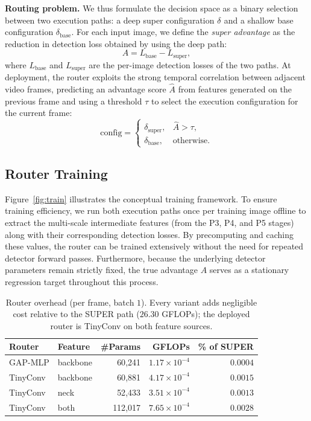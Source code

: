 \medskip
\noindent\textbf{Routing problem.}
We thus formulate the decision space as a binary selection between two execution paths: a deep super configuration $\delta_{\text{}}$ and a shallow base configuration $\delta_{\text{base}}$. 
For each input image, we define the \emph{super advantage} as the reduction in detection loss obtained by using the deep path:
\begin{equation}
A = L_{\text{base}} - L_{\text{super}},
\label{eq:advantage}
\end{equation}
where $L_{\text{base}}$ and $L_{\text{super}}$ are the per-image detection
losses of the two paths. 
At deployment, the router exploits the strong temporal correlation between adjacent video frames, predicting an advantage score $\hat{A}$ from features generated on the previous frame and using a threshold $\tau$ to select the execution configuration for the current frame:
\begin{equation}
\text{config} =
\begin{cases}
\delta_{\text{super}}, & \hat{A} > \tau,\\[2pt]
\delta_{\text{base}},  & \text{otherwise.}
\end{cases}
\label{eq:route}
\end{equation}


\subsection{Router Training}
\label{sec:method_training}
Figure~\ref{fig:train} illustrates the conceptual training framework.
To ensure training efficiency, we run both execution paths once per training image offline to extract the multi-scale intermediate features (from the P3, P4, and P5 stages) along with their corresponding detection losses.
By precomputing and caching these values, the router can be trained extensively without the need for repeated detector forward passes.
Furthermore, because the underlying detector parameters remain strictly fixed, the true advantage $A$ serves as a stationary regression target throughout this process.


\begin{table}[t]
\caption{Router overhead (per frame, batch $1$). Every variant adds negligible cost
relative to the SUPER path ($26.30$ GFLOPs); the deployed router is TinyConv on both feature sources.}
\label{tab:overhead}
\centering
\begin{tabular}{llrrr}
\toprule
Router & Feature & \#Params & GFLOPs & \% of SUPER\\
\midrule
GAP-MLP & backbone & 60{,}241 & $1.17\times10^{-4}$ & $0.0004$\\
TinyConv & backbone & 60{,}881 & $4.17\times10^{-4}$ & $0.0015$\\
TinyConv & neck & 52{,}433 & $3.51\times10^{-4}$ & $0.0013$\\
TinyConv & both & 112{,}017 & $7.65\times10^{-4}$ & $0.0028$\\
\bottomrule
\end{tabular}
\end{table}


